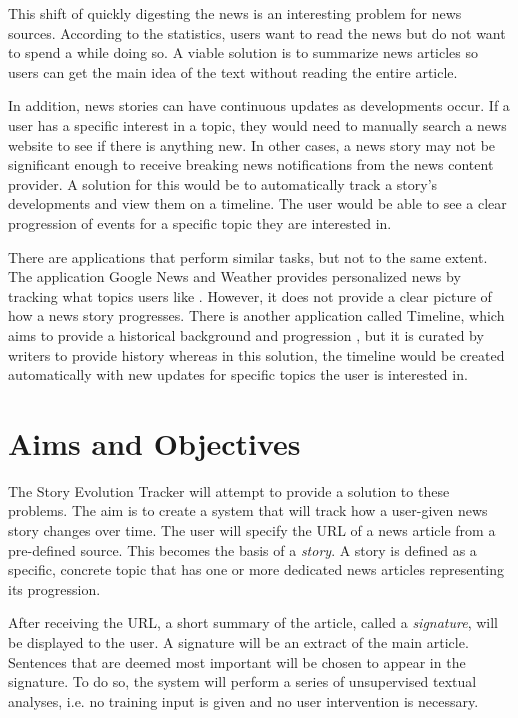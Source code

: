 \documentclass[11pt,titlepage]{report}
\begin{document}
This shift of quickly digesting the news is an interesting problem for news sources. According to the statistics, users want to read the news but do not want to spend a while doing so. A viable solution is to summarize news articles so users can get the main idea of the text without reading the entire article.

In addition, news stories can have continuous updates as developments occur. If a user has a specific interest in a topic, they would need to manually search a news website to see if there is anything new. In other cases, a news story may not be significant enough to receive breaking news notifications from the news content provider. A solution for this would be to automatically track a story's developments and view them on a timeline. The user would be able to see a clear progression of events for a specific topic they are interested in.

There are applications that perform similar tasks, but not to the same extent. The application Google News and Weather provides personalized news by tracking what topics users like \cite{googlenews}. However, it does not provide a clear picture of how a news story progresses. There is another application called Timeline, which aims to provide a historical background and progression \cite{timeline_techcrunch}, but it is curated by writers to provide history whereas in this solution, the timeline would be created automatically with new updates for specific topics the user is interested in.

\section{Aims and Objectives}
The Story Evolution Tracker will attempt to provide a solution to these problems. The aim is to create a system that will track how a user-given news story changes over time. The user will specify the URL of a news article from a pre-defined source. This becomes the basis of a \textit{story}. A story is defined as a specific, concrete topic that has one or more dedicated news articles representing its progression.

After receiving the URL, a short summary of the article, called a \textit{signature}, will be displayed to the user. A signature will be an extract of the main article. Sentences that are deemed most important will be chosen to appear in the signature. To do so, the system will perform a series of unsupervised textual analyses, i.e. no training input is given and no user intervention is necessary.
\end{document}
